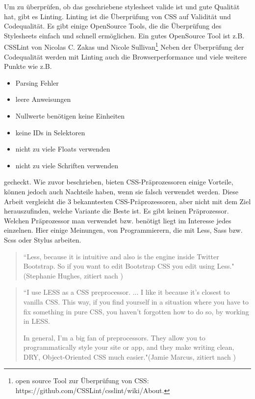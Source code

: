 Um zu überprüfen, ob das geschriebene stylesheet valide ist und gute Qualität hat, gibt es Linting. Linting ist die Überprüfung von CSS auf Validität und Codequalität. Es gibt einige OpenSource Tools, die die Überprüfung des Stylesheets einfach und schnell ermöglichen. Ein gutes OpenSource Tool ist z.B. CSSLint von Nicolas C. Zakas und Nicole Sullivan\footnote[1]{open source Tool zur Überprüfung von CSS: https://github.com/CSSLint/csslint/wiki/About.}\newline
Neben der Überprüfung der Codequalität werden mit Linting auch die Browserperformance und viele weitere Punkte wie z.B.
\begin{itemize}
  \item Parsing Fehler
  \item leere Anweisungen
  \item Nullwerte benötigen keine Einheiten
  \item keine IDs in Selektoren
  \item nicht zu viele Floats verwenden
  \item nicht zu viele Schriften verwenden
\end{itemize} 
gecheckt. \newline\newline
Wie zuvor beschrieben, bieten CSS-Präprozessoren einige Vorteile, können jedoch auch Nachteile haben,  wenn sie falsch verwendet werden. Diese Arbeit vergleicht die 3 bekanntesten CSS-Präprozessoren, aber nicht mit dem Ziel herauszufinden, welche Variante die Beste ist. Es gibt keinen \glqq{} Präprozessor.\newline
Welchen Präprozessor man verwendet bzw. benötigt liegt im Interesse jedes einzelnen. Hier einige Meinungen, von Programmierern, die mit Less, Sass bzw. Scss oder Stylus arbeiten. 
\begin{quote}
``Less, because it is intuitive and also is the engine inside Twitter Bootstrap. So if you want to edit Bootstrap CSS you edit using Less."(Stephanie Hughes, zitiert nach \cite[]{psdtowp.2014})
\end{quote} 
\begin{quote}
``I use LESS as a CSS preprocessor. ... I like it because it's closest to vanilla CSS. This way, if you find yourself in a situation where you have to fix something in pure CSS, you haven't forgotten how to do so, by working in LESS.

In general, I'm a big fan of preprocessors. They allow you to programmatically style your site or app, and they make writing clean, DRY, Object-Oriented CSS much easier."(Jamie Marcus, zitiert nach \cite[]{psdtowp.2014})
\end{quote} 
